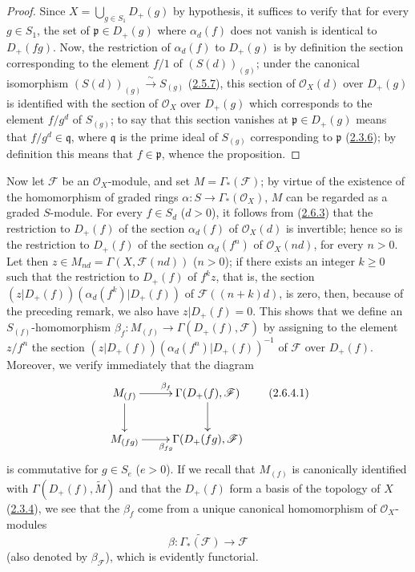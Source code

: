 \begin{proof}
Since $X=\bigcup_{g\in S_1}D_+(g)$ by hypothesis, it suffices to verify that
for every $g\in S_1$, the set of $\mathfrak{p}\in D_+(g)$ where
$\alpha_d(f)$ does not vanish is identical to $D_+(fg)$. Now, the
restriction of $\alpha_d(f)$ to $D_+(g)$ is by definition the section
corresponding to the element $f/1$ of $(S(d))_{(g)}$; under the canonical
isomorphism
$(S(d))_{(g)}\xrightarrow{\sim}S_{(g)}$
(\hyperref[II.2.5.7]{2.5.7}), this section of $\mathcal{O}_X(d)$
over $D_+(g)$ is identified with the section of $\mathcal{O}_X$ over
$D_+(g)$ which corresponds to the element $f/g^d$ of $S_{(g)}$; to say that
this section vanishes at $\mathfrak{p}\in D_+(g)$ means that
$f/g^d\in\mathfrak{q}$, where $\mathfrak{q}$ is the prime ideal of $S_{(g)}$
corresponding to $\mathfrak{p}$ (\hyperref[II.2.3.6]{2.3.6}); by
definition this means that $f\in\mathfrak{p}$, whence the proposition.
\end{proof}

\begin{env}[2.6.4]
\label{II.2.6.4}
Now let $\mathcal{F}$ be an $\mathcal{O}_X$-module, and set
$M=\Gamma_*(\mathcal{F})$; by virtue of the existence of the homomorphism
of graded rings $\alpha:S\to\Gamma_*(\mathcal{O}_X)$, $M$ can be
regarded as a graded $S$-module. For every $f\in S_d$ ($d>0$), it
follows from (\hyperref[II.2.6.3]{2.6.3}) that the restriction to
$D_+(f)$ of the section $\alpha_d(f)$ of $\mathcal{O}_X(d)$ is invertible;
hence so is the restriction to $D_+(f)$ of the section $\alpha_d(f^n)$ of
$\mathcal{O}_X(nd)$, for every $n>0$. Let then
$z\in M_{nd}=\Gamma(X,\mathcal{F}(nd))$ ($n>0$); if there exists an integer
$k\geq0$ such that the restriction to $D_+(f)$ of $f^kz$, that is, the
section
$(z|D_+(f))(\alpha_d(f^k)|D_+(f))$ of $\mathcal{F}((n+k)d)$, is zero,
then, because of the preceding remark, we also have $z|D_+(f)=0$. This
shows that we define an $S_{(f)}$-homomorphism
$\beta_f:M_{(f)}\to\Gamma(D_+(f),\mathcal{F})$ by assigning to
the element $z/f^n$ the section
$(z|D_+(f))(\alpha_d(f^n)|D_+(f))^{-1}$ of $\mathcal{F}$ over
$D_+(f)$. Moreover, we verify immediately that the diagram
\[
\label{II.2.6.4.1}
  \xymatrix{
    M_{(f)}\ar[r]^{\beta_f}\ar[d]
    & \Gamma(D_+(f),\mathcal{F})\ar[d]\\
    M_{(fg)}\ar[r]_{\beta_{fg}}
    & \Gamma(D_+(fg),\mathcal{F})
  }
\tag{2.6.4.1}
\]
is commutative for $g\in S_e$ ($e>0$). If we recall that $M_{(f)}$
is canonically identified with $\Gamma(D_+(f),\widetilde{M})$ and that the
$D_+(f)$ form a basis of the topology of $X$
(\hyperref[II.2.3.4]{2.3.4}), we see that the $\beta_f$ come from a
unique canonical homomorphism of $\mathcal{O}_X$-modules
\[
\label{II.2.6.4.2}
  \beta:\widetilde{\Gamma_*(\mathcal{F})}
  \longrightarrow\mathcal{F}
\tag{2.6.4.2}
\]
(also denoted by $\beta_{\mathcal{F}}$), which is evidently functorial.
\end{env}

